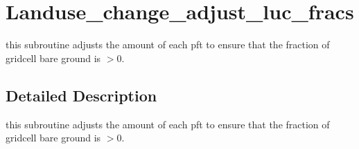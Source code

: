 \hypertarget{group__landuse__change__adjust__luc__fracs}{}\section{Landuse\+\_\+change\+\_\+adjust\+\_\+luc\+\_\+fracs}
\label{group__landuse__change__adjust__luc__fracs}


this subroutine adjusts the amount of each pft to ensure that the fraction of gridcell bare ground is $>$0.  




\subsection{Detailed Description}
this subroutine adjusts the amount of each pft to ensure that the fraction of gridcell bare ground is $>$0. 

